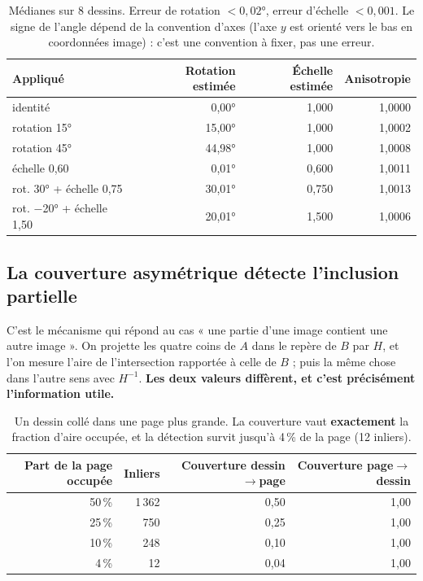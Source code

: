 \documentclass[11pt,a4paper]{article}
\begin{document}
\begin{table}[h]
\centering\small
\begin{tabular}{lrrr}
\toprule
\textbf{Appliqué} & \textbf{Rotation estimée} & \textbf{Échelle estimée}
  & \textbf{Anisotropie} \\
\midrule
identité                  & \phantom{$-$}0,00° & 1,000 & 1,0000 \\
rotation 15°              & 15,00°           & 1,000 & 1,0002 \\
rotation 45°              & 44,98°           & 1,000 & 1,0008 \\
échelle 0,60              & \phantom{$-$}0,01° & 0,600 & 1,0011 \\
rot. 30° + échelle 0,75   & 30,01°           & 0,750 & 1,0013 \\
rot. $-$20° + échelle 1,50  & 20,01°           & 1,500 & 1,0006 \\
\bottomrule
\end{tabular}
\caption{Médianes sur 8 dessins. Erreur de rotation $<0{,}02°$, erreur d'échelle
$<0{,}001$. Le signe de l'angle dépend de la convention d'axes (l'axe $y$ est
orienté vers le bas en coordonnées image) : c'est une convention à fixer, pas
une erreur.}
\end{table}

\subsection{La couverture asymétrique détecte l'inclusion partielle}

C'est le mécanisme qui répond au cas « une partie d'une image contient une autre
image ». On projette les quatre coins de $A$ dans le repère de $B$ par $H$, et
l'on mesure l'aire de l'intersection rapportée à celle de $B$ ; puis la même
chose dans l'autre sens avec $H^{-1}$. \textbf{Les deux valeurs diffèrent, et
c'est précisément l'information utile.}

\begin{table}[h]
\centering\small
\begin{tabular}{rrrr}
\toprule
\textbf{Part de la page occupée} & \textbf{Inliers} &
\textbf{Couverture dessin$\to$page} & \textbf{Couverture page$\to$dessin} \\
\midrule
50\,\% & 1\,362 & 0,50 & 1,00 \\
25\,\% & \phantom{0}750 & 0,25 & 1,00 \\
10\,\% & \phantom{0}248 & 0,10 & 1,00 \\
\phantom{0}4\,\% & \phantom{00}12 & 0,04 & 1,00 \\
\bottomrule
\end{tabular}
\caption{Un dessin collé dans une page plus grande. La couverture vaut
\textbf{exactement} la fraction d'aire occupée, et la détection survit jusqu'à
4\,\% de la page (12 inliers).}
\end{table}
\end{document}
